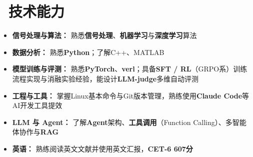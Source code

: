 \section{\makebox[\widthof{\faCogs}][c]{\color{CVBlue}\faCogs}\ 技术能力}
\begin{itemize}[nosep]
    \item \textbf{信号处理与算法：} 熟悉\textbf{信号处理}、\textbf{机器学习}与\textbf{深度学习}算法
    \item \textbf{数据分析：} 熟悉\textbf{Python}；了解C++、MATLAB
    \item \textbf{模型训练与评测：} 熟悉\textbf{PyTorch}、\textbf{verl}；具备\textbf{SFT / RL}（GRPO系）训练流程实现与消融实验经验，能设计\textbf{LLM-judge}多维自动评测
    \item \textbf{工程与工具：} 掌握Linux基本命令与Git版本管理，熟练使用\textbf{Claude Code}等AI开发工具提效
    \item \textbf{LLM 与 Agent：} 了解\textbf{Agent}架构、\textbf{工具调用}（Function Calling）、多智能体协作与\textbf{RAG}
    \item \textbf{英语：} 熟练阅读英文文献并使用英文汇报，\textbf{CET-6 607分}
\end{itemize}
